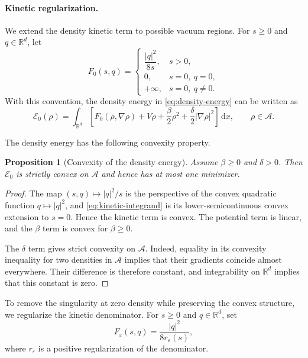 \documentclass[11pt]{article}
\newcommand{\R}{\mathbb{R}}
\newcommand{\A}{\mathcal{A}}
\newcommand{\E}{\mathcal{E}}
\newcommand{\dd}{\,\mathrm{d}}
\newcommand{\eps}{\varepsilon}
\theoremstyle{plain}
\newtheorem{proposition}[theorem]{Proposition}
\theoremstyle{definition}
\numberwithin{equation}{section}
\begin{document}
\paragraph{Kinetic regularization.}

We extend the density kinetic term to possible vacuum regions.
For $s\ge0$ and $q\in\R^d$, let
\begin{equation}
\label{eq:kinetic-integrand}
F_0(s,q)
=
\begin{cases}
\dfrac{|q|^2}{8s}, & s>0,\\[1ex]
0, & s=0,\ q=0,\\
+\infty, & s=0,\ q\ne0.
\end{cases}
\end{equation}
With this convention, the density energy in
\eqref{eq:density-energy} can be written as
\begin{equation}
\label{eq:density-energy-extended}
\E_0(\rho)
=
\int_{\R^d}
\left[
F_0(\rho,\nabla\rho)
+V\rho
+\frac{\beta}{2}\rho^2
+\frac{\delta}{2}|\nabla\rho|^2
\right]\dd x,
\qquad
\rho\in\A.
\end{equation}

The density energy has the following convexity property.

\begin{proposition}[Convexity of the density energy]
\label{prop:density-convexity}
Assume $\beta\ge0$ and $\delta>0$.
Then $\E_0$ is strictly convex on $\A$ and hence has at most one
minimizer.
\end{proposition}

\begin{proof}
The map $(s,q)\mapsto |q|^2/s$ is the perspective of the convex
quadratic function $q\mapsto |q|^2$, and
\eqref{eq:kinetic-integrand} is its lower-semicontinuous convex
extension to $s=0$. Hence the kinetic term is convex. The potential
term is linear, and the $\beta$ term is convex for $\beta\ge0$.

The $\delta$ term gives strict convexity on $\A$. Indeed, equality in
its convexity inequality for two densities in $\A$ implies that their
gradients coincide almost everywhere. Their difference is therefore
constant, and integrability on $\R^d$ implies that this constant is
zero.
\end{proof}

To remove the singularity at zero density while preserving the convex
structure, we regularize the kinetic denominator. For $s\ge0$ and
$q\in\R^d$, set
\begin{equation}
\label{eq:regularized-kinetic-integrand}
F_\eps(s,q)
=
\frac{|q|^2}{8r_\eps(s)},
\end{equation}
where $r_\eps$ is a positive regularization of the denominator.
\end{document}
